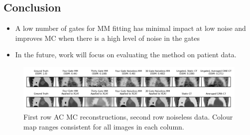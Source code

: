 \documentclass[portrait, color=UCLburgundy, margin=1cm]{uclposter}
\begin{document}
\begin{multicols}{3}
        \section*{Conclusion}
            \begin{highlightbox}[UCLlightgreen]
                \begin{itemize}
                    \item A low number of gates for \gls{MM} fitting has minimal impact at low noise and improves \gls{MC} when there is a high level of noise in the gates
                    \item In the future, work will focus on evaluating the method on patient data.
                \end{itemize}
            \end{highlightbox}
        
        \AtNextBibliography{\tiny}
        \printbibliography
    \end{multicols}
    
    \begin{figure}[H]
        \centering
        
        \includegraphics[width=1.0\linewidth]{visual_analysis.png}
        
        \begin{highlightbox}[UCLlightblue]
            \captionsetup{singlelinecheck=false, justification=centering}
            \caption{First row \gls{AC} \gls{MC} reconstructions, second row noiseless data. Colour map ranges consistent for all images in each column.}
        \end{highlightbox}
        
        \label{fig:visual_analysis}
    \end{figure}
    
\end{document}
